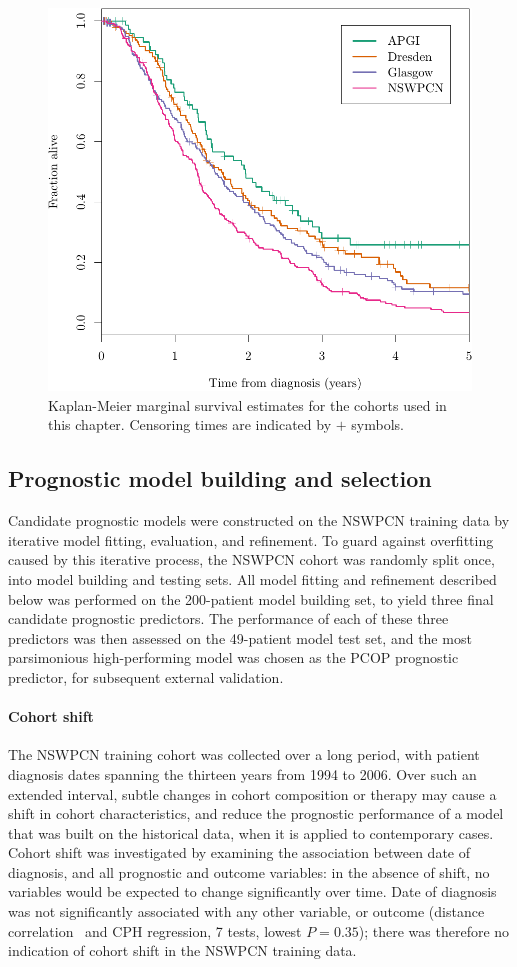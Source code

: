 \documentclass[dissertation.tex]{subfiles}
\begin{document}
\begin{figure}[!htbp]
\centering
  \includegraphics[width=.7\textwidth]{analysis/nomogram/figure/07-cohort-surv-comparison-1}
\caption[Cohort marginal survival estimates]{Kaplan-Meier marginal survival estimates for the cohorts used in this chapter.  Censoring times are indicated by $+$ symbols.}
\label{fig:nomo-cohort-km}
\end{figure}

\subsection{Prognostic model building and selection}
Candidate prognostic models were constructed on the \gls{NSWPCN} training data by iterative model fitting, evaluation, and refinement.  To guard against overfitting caused by this iterative process, the \gls{NSWPCN} cohort was randomly split once, into model building and testing sets.  All model fitting and refinement described below was performed on the 200-patient model building set, to yield three final candidate prognostic predictors.  The performance of each of these three predictors was then assessed on the 49-patient model test set, and the most parsimonious high-performing model was chosen as the \gls{PCOP} prognostic predictor, for subsequent external validation.

\paragraph{Cohort shift}
The \gls{NSWPCN} training cohort was collected over a long period, with patient diagnosis dates spanning the thirteen years from 1994 to 2006.  Over such an extended interval, subtle changes in cohort composition or therapy may cause a shift in cohort characteristics, and reduce the prognostic performance of a model that was built on the historical data, when it is applied to contemporary cases.  Cohort shift was investigated by examining the association between date of diagnosis, and all prognostic and outcome variables: in the absence of shift, no variables would be expected to change significantly over time.  Date of diagnosis was not significantly associated with any other variable, or outcome (distance correlation~\cite{Szekely2013} and \gls{CPH} regression, 7 tests, lowest $P = 0.35$); there was therefore no indication of cohort shift in the \gls{NSWPCN} training data.
\end{document}
